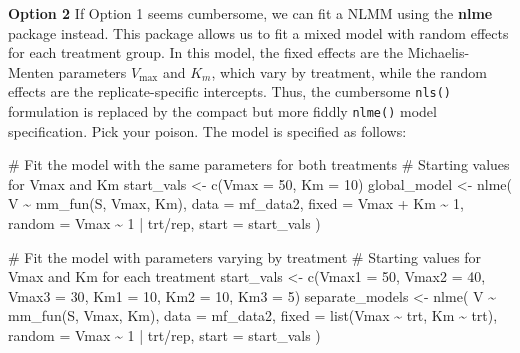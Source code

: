 \documentclass[
  letterpaper,
]{book}
\newenvironment{Shaded}{\begin{snugshade}}{\end{snugshade}}
\newcommand{\AttributeTok}[1]{\textcolor[rgb]{0.40,0.45,0.13}{#1}}
\newcommand{\CommentTok}[1]{\textcolor[rgb]{0.37,0.37,0.37}{#1}}
\newcommand{\DecValTok}[1]{\textcolor[rgb]{0.68,0.00,0.00}{#1}}
\newcommand{\FunctionTok}[1]{\textcolor[rgb]{0.28,0.35,0.67}{#1}}
\newcommand{\NormalTok}[1]{\textcolor[rgb]{0.00,0.23,0.31}{#1}}
\newcommand{\OtherTok}[1]{\textcolor[rgb]{0.00,0.23,0.31}{#1}}
\newcommand{\SpecialCharTok}[1]{\textcolor[rgb]{0.37,0.37,0.37}{#1}}
\newcommand*\circled[1]{\tikz[baseline=(char.base)]{
          \node[shape=circle,draw,inner sep=1pt] (char) {{\scriptsize#1}};}}
\begin{document}
\textbf{Option 2} If Option 1 seems cumbersome, we can fit a NLMM using
the \textbf{nlme} package instead. This package allows us to fit a mixed
model with random effects for each treatment group. In this model, the
fixed effects are the Michaelis-Menten parameters \(V_{\max}\) and
\(K_m\), which vary by treatment, while the random effects are the
replicate-specific intercepts. Thus, the cumbersome \texttt{nls()}
formulation is replaced by the compact but more fiddly \texttt{nlme()}
model specification. Pick your poison. The model is specified as
follows:

\label{annotated-cell-64}%
\begin{Shaded}
\begin{Highlighting}[]
\CommentTok{\# Fit the model with the same parameters for both treatments}
\CommentTok{\# Starting values for Vmax and Km}
\NormalTok{start\_vals }\OtherTok{\textless{}{-}} \FunctionTok{c}\NormalTok{(}\AttributeTok{Vmax =} \DecValTok{50}\NormalTok{, }\AttributeTok{Km =} \DecValTok{10}\NormalTok{)}
\NormalTok{global\_model }\OtherTok{\textless{}{-}} \FunctionTok{nlme}\NormalTok{(}
\NormalTok{  V }\SpecialCharTok{\textasciitilde{}} \FunctionTok{mm\_fun}\NormalTok{(S, Vmax, Km),}
  \AttributeTok{data =}\NormalTok{ mf\_data2,}
  \AttributeTok{fixed =}\NormalTok{ Vmax }\SpecialCharTok{+}\NormalTok{ Km }\SpecialCharTok{\textasciitilde{}} \DecValTok{1}\NormalTok{, }\hspace*{\fill}\NormalTok{\circled{1}}
  \AttributeTok{random =}\NormalTok{ Vmax }\SpecialCharTok{\textasciitilde{}} \DecValTok{1} \SpecialCharTok{|}\NormalTok{ trt}\SpecialCharTok{/}\NormalTok{rep, }\hspace*{\fill}\NormalTok{\circled{2}}
  \AttributeTok{start =}\NormalTok{ start\_vals}
\NormalTok{)}

\CommentTok{\# Fit the model with parameters varying by treatment}
\CommentTok{\# Starting values for Vmax and Km for each treatment}
\NormalTok{start\_vals }\OtherTok{\textless{}{-}} \FunctionTok{c}\NormalTok{(}\AttributeTok{Vmax1 =} \DecValTok{50}\NormalTok{, }\AttributeTok{Vmax2 =} \DecValTok{40}\NormalTok{, }\AttributeTok{Vmax3 =} \DecValTok{30}\NormalTok{,}
                \AttributeTok{Km1 =} \DecValTok{10}\NormalTok{, }\AttributeTok{Km2 =} \DecValTok{10}\NormalTok{, }\AttributeTok{Km3 =} \DecValTok{5}\NormalTok{) }\hspace*{\fill}\NormalTok{\circled{3}}
\NormalTok{separate\_models }\OtherTok{\textless{}{-}} \FunctionTok{nlme}\NormalTok{(}
\NormalTok{  V }\SpecialCharTok{\textasciitilde{}} \FunctionTok{mm\_fun}\NormalTok{(S, Vmax, Km),}
  \AttributeTok{data =}\NormalTok{ mf\_data2,}
  \AttributeTok{fixed =} \FunctionTok{list}\NormalTok{(Vmax }\SpecialCharTok{\textasciitilde{}}\NormalTok{ trt, Km }\SpecialCharTok{\textasciitilde{}}\NormalTok{ trt), }\hspace*{\fill}\NormalTok{\circled{4}}
  \AttributeTok{random =}\NormalTok{ Vmax }\SpecialCharTok{\textasciitilde{}} \DecValTok{1} \SpecialCharTok{|}\NormalTok{ trt}\SpecialCharTok{/}\NormalTok{rep,}
  \AttributeTok{start =}\NormalTok{ start\_vals}
\NormalTok{)}
\end{Highlighting}
\end{Shaded}
\end{document}
